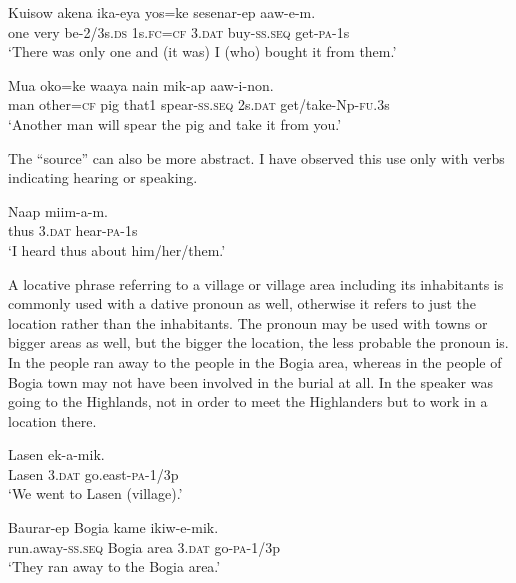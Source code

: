 \ea%
\label{ex:3:x1784}
\gll Kuisow akena ika-eya yos=ke  sesenar-ep aaw-e-m. \\
one very be-2/3s.\textsc{ds} 1s.\textsc{fc}=\textsc{cf} 3.\textsc{dat} buy-\textsc{ss}.\textsc{seq} get-\textsc{pa}-1s\\
\glt`There was only one and (it was) I (who) bought it from them.'
\z

\ea%
\label{ex:3:x1785}
\gll Mua oko=ke waaya nain mik-ap  aaw-i-non. \\
man other=\textsc{cf} pig that1 spear-\textsc{ss}.\textsc{seq} 2s.\textsc{dat} get/take-Np-\textsc{fu}.3s\\
\glt`Another man will spear the pig and take it from you.'
\z

The ``source'' can also be more abstract. I have observed this use only with verbs indicating hearing or speaking.

\ea%
\label{ex:3:x1786}
\gll Naap  miim-a-m. \\
thus 3.\textsc{dat} hear-\textsc{pa}-1s\\
\glt`I heard thus about him/her/them.'
\z

A locative phrase referring to a village or village area including its inhabitants is commonly used with a dative pronoun as well, otherwise it refers to just the location rather than the inhabitants. The pronoun may be used with towns or bigger areas as well, but the bigger the location, the less probable the pronoun is. In  the people ran away to the people in the Bogia area, whereas in  the people of Bogia town may not have been involved in the burial at all. In  the speaker was going to the Highlands, not in order to meet the Highlanders but to work in a location there. 

\ea%
\label{ex:3:x586}
\gll Lasen  ek-a-mik. \\
Lasen 3.\textsc{dat} go.east-\textsc{pa}-1/3p\\
\glt`We went to Lasen (village).'
\z

\ea%
\label{ex:3:x587}
\gll Baurar-ep Bogia kame  ikiw-e-mik. \\
run.away-\textsc{ss}.\textsc{seq} Bogia area 3.\textsc{dat} go-\textsc{pa}-1/3p\\
\glt`They ran away to the Bogia area.'
\z

